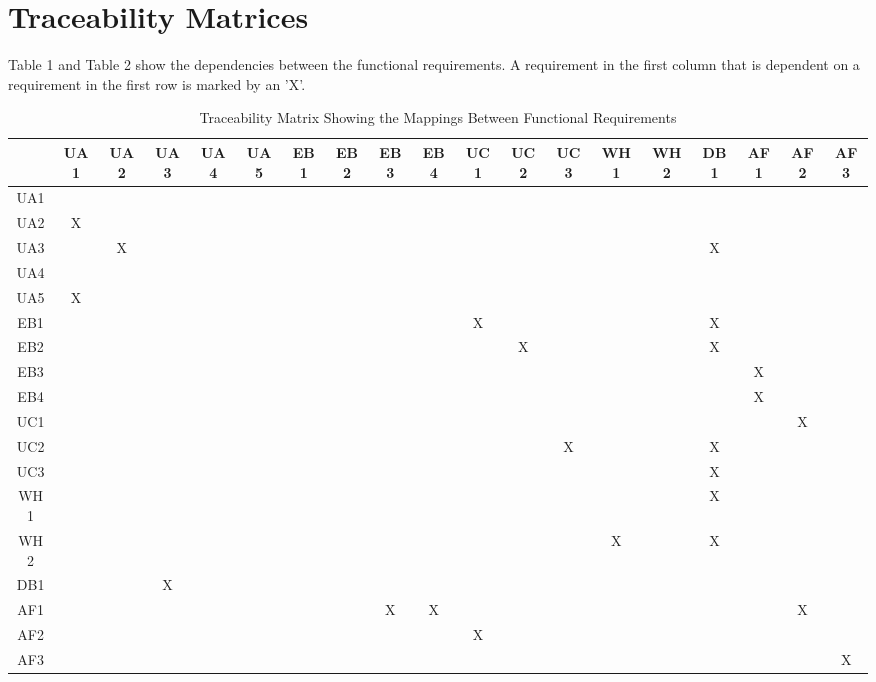 \documentclass[12pt]{article}
\begin{document}
\section{Traceability Matrices}
Table 1 and Table 2 show the dependencies between the functional requirements. A requirement in the first column that is dependent on a requirement in the first row is marked by an 'X'.


\begin{landscape}

\begin{table}[h!]
\centering
\begin{tabular}{|c|c|c|c|c|c|c|c|c|c|c|c|c|c|c|c|c|c|c|}
 \hline
   & UA1 & UA2 & UA3 & UA4 & UA5 & EB1 & EB2 & EB3 & EB4 & UC1 & UC2 & UC3 & WH1 & WH2 & DB1 & AF1 & AF2 & AF3 \\
 \hline
 UA1 & & & & & & & & & & & & & & & & & & \\
 \hline
 UA2 & X & & & & & & & & & & & & & & & & & \\
 \hline
 UA3 & & X & & & & & & & & & & & & & X & & & \\
 \hline
 UA4 & & & & & & & & & & & & & & & & & & \\
 \hline
 UA5 & X & & & & & & & & & & & & & & & & & \\
 \hline
 EB1 & & & & & & & & & & X & & & & & X & & & \\
 \hline
 EB2 & & & & & & & & & & & X & & & & X & & & \\
 \hline
 EB3 & & & & & & & & & & & & & & & & X & & \\
 \hline
 EB4 & & & & & & & & & & & & & & & & X & & \\
 \hline
 UC1 & & & & & & & & & & & & & & & & & X & \\
 \hline
 UC2 & & & & & & & & & & & & X & & & X & & & \\
 \hline
 UC3 & & & & & & & & & & & & & & & X & & & \\
 \hline
 WH1 & & & & & & & & & & & & & & & X & & & \\
 \hline
 WH2 & & & & & & & & & & & & & X & & X & & & \\
 \hline
 DB1 & & & X & & & & & & & & & & & & & & & \\
 \hline
 AF1 & & & & & & & & X & X & & & & & & & & X & \\
 \hline
 AF2 & & & & & & & & & & X & & & & & & & & \\
 \hline
 AF3 & & & & & & & & & & & & & & & & & & X \\
 \hline
\end{tabular}
\caption{Traceability Matrix Showing the Mappings Between Functional Requirements}
\label{Table:A_trace}
\end{table}

\end{landscape}
\end{document}

